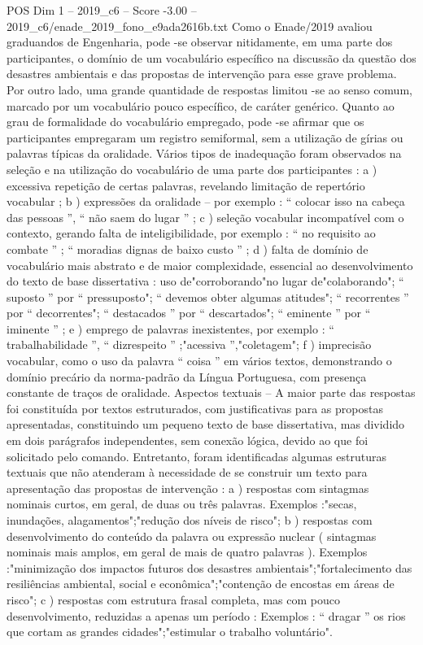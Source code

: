 \begin{textsample}{POS Dim 1 – 2019\_c6 – Score -3.00 – 2019\_c6/enade\_2019\_fono\_e9ada2616b.txt}
Como o Enade/2019 avaliou graduandos de Engenharia, pode -se observar nitidamente, em uma parte dos participantes, o domínio de um vocabulário específico na discussão da questão dos desastres ambientais e das propostas de intervenção para esse grave problema.
Por outro lado, uma grande quantidade de respostas limitou -se ao senso comum, marcado por um vocabulário pouco específico, de caráter genérico.
Quanto ao grau de formalidade do vocabulário empregado, pode -se afirmar que os participantes empregaram um registro semiformal, sem a utilização de gírias ou palavras típicas da oralidade.
Vários tipos de inadequação foram observados na seleção e na utilização do vocabulário de uma parte dos participantes : a ) excessiva repetição de certas palavras, revelando limitação de repertório vocabular ; b ) expressões da oralidade – por exemplo : “ colocar isso na cabeça das pessoas ”, “ não saem do lugar ” ; c ) seleção vocabular incompatível com o contexto, gerando falta de inteligibilidade, por exemplo : “ no requisito ao combate ” ; “ moradias dignas de baixo custo ” ; d ) falta de domínio de vocabulário mais abstrato e de maior complexidade, essencial ao desenvolvimento do texto de base dissertativa : uso de"corroborando"no lugar de"colaborando"; “ suposto ” por “ pressuposto"; “ devemos obter algumas atitudes"; “ recorrentes ” por “ decorrentes"; “ destacados ” por “ descartados"; “ eminente ” por “ iminente ” ; e ) emprego de palavras inexistentes, por exemplo : “ trabalhabilidade ”, “ dizrespeito ” ;"acessiva ”,"coletagem"; f ) imprecisão vocabular, como o uso da palavra “ coisa ” em vários textos, demonstrando o domínio precário da norma-padrão da Língua Portuguesa, com presença constante de traços de oralidade.
Aspectos textuais – A maior parte das respostas foi constituída por textos estruturados, com justificativas para as propostas apresentadas, constituindo um pequeno texto de base dissertativa, mas dividido em dois parágrafos independentes, sem conexão lógica, devido ao que foi solicitado pelo comando.
Entretanto, foram identificadas algumas estruturas textuais que não atenderam à necessidade de se construir um texto para apresentação das propostas de intervenção : a ) respostas com sintagmas nominais curtos, em geral, de duas ou três palavras.
Exemplos :"secas, inundações, alagamentos";"redução dos níveis de risco"; b ) respostas com desenvolvimento do conteúdo da palavra ou expressão nuclear ( sintagmas nominais mais amplos, em geral de mais de quatro palavras ).
Exemplos :"minimização dos impactos futuros dos desastres ambientais";"fortalecimento das resiliências ambiental, social e econômica";"contenção de encostas em áreas de risco"; c ) respostas com estrutura frasal completa, mas com pouco desenvolvimento, reduzidas a apenas um período : Exemplos : “ dragar ” os rios que cortam as grandes cidades";"estimular o trabalho voluntário".

\end{textsample}
